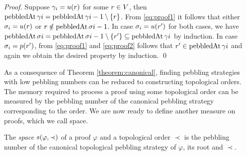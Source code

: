 \begin{proof}
Suppose $\gamma_i = u(r)$ for some $r \in V$, then $\operatorname{pebbledAt}{\gamma}{i} = \operatorname{pebbledAt}{\gamma}{i-1} \setminus \{r\}$.
From \ref{eq:proof1} it follows that either $\sigma_i = u(r)$ or $r \notin \operatorname{pebbledAt}{\sigma}{i-1}$.
In case $\sigma_i = u(r')$ for both cases, we have $\operatorname{pebbledAt}{\sigma}{i} = \operatorname{pebbledAt}{\sigma}{i-1} \setminus \{r'\} \subseteq \operatorname{pebbledAt}{\gamma}{i}$ by induction.
In case $\sigma_i = p(r')$, from \ref{eq:proof1} and \ref{eq:proof2} follows that $r' \in \operatorname{pebbledAt}{\gamma}{i}$ and again we obtain the desired property by induction.
%
\qed
\end{proof}

As a consequence of Theorem \ref{theorem:canonical}, finding pebbling strategies with low pebbling numbers can be reduced to constructing topological orders.
The memory required to process a proof using some topological order can be measured by the pebbling number of the canonical pebbling strategy corresponding to the order.
We are now ready to define another measure on proofs, which we call space.

\begin{definition}
\label{def:space measure}
The \emph{space} $s(\varphi,\prec)$ 
of a proof $\varphi$ and a topological order $\prec$ is the pebbling number of the canonical topological pebbling strategy of $\varphi$, its root and $\prec$.
\end{definition}

